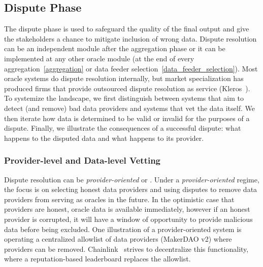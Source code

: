 
% 

\subsection{Dispute Phase}\label{dispute_phase} 



The dispute phase is used to safeguard the quality of the final output and give the stakeholders a chance to mitigate inclusion of wrong data. Dispute resolution can be an independent module after the aggregation phase or it can be implemented at any other oracle module (\eg at the end of every aggregation~\ref{aggregation} or data feeder selection~\ref{data_feeder_selection}). Most oracle systems do dispute resolution internally, but market specialization has produced firms that provide outsourced dispute resolution as service (\eg Kleros~\cite{kleros}). To systemize the landscape, we first distinguish between systems that aim to detect (and remove) bad data providers and systems that vet the data itself. We then iterate how data is determined to be valid or invalid for the purposes of a dispute. Finally, we illustrate the consequences of a successful dispute: what happens to the disputed data and what happens to its provider. 


\subsubsection{Provider-level and Data-level Vetting}\label{provideranddatavetting}

Dispute resolution can be \textit{provider-oriented} or . Under a \textit{provider-oriented} regime, the focus is on selecting honest data providers and using disputes to remove data providers from serving as oracles in the future. In the optimistic case that providers are honest, oracle data is available immediately, however if an honest provider is corrupted, it will have a window of opportunity to provide malicious data before being excluded. One illustration of a provider-oriented system is operating a centralized allowlist of data providers (\eg MakerDAO v2) where providers can be removed. Chainlink~\cite{ellis2017chainlink}  strives to decentralize this functionality, where a reputation-based leaderboard replaces the allowlist. 

